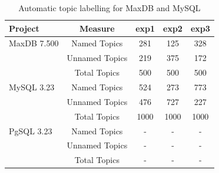 \documentclass[smallextended]{svjour3}       %
\begin{document}
\begin{table}

	\centering
\begin{tabular}{l|c|c|c|c}
\toprule
\textbf{Project} & \textbf{Measure} & \textsf{exp1} & \textsf{exp2} & \textsf{exp3} \\
\midrule



MaxDB 7.500 & Named Topics   & 281 & 125 & 328 \\ %
 & Unnamed Topics & 219  & 375 &  172  \\
 & Total  Topics  & 500 & 500 & 500 \\
\midrule
MySQL 3.23  & Named Topics   & 524 & 273 & 773 \\
  & Unnamed Topics & 476 & 727 & 227 \\
  & Total  Topics  & 1000 & 1000 & 1000 \\
\midrule
PgSQL 3.23  & Named Topics   & - & - & - \\
  & Unnamed Topics & - & - & - \\
  & Total  Topics  & - & - & - \\

\bottomrule
\end{tabular}
	\caption{Automatic topic labelling for MaxDB and MySQL}%
	\label{tbl:wordlist}

\end{table}
\end{document}
